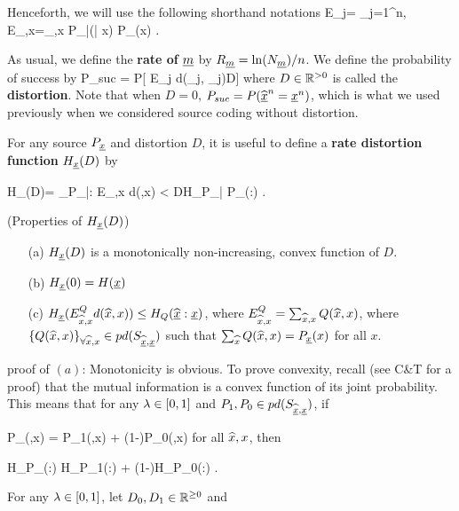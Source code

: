 Henceforth, we will use
the following shorthand notations
\beq
E_j= \sum_{j=1}^n\;,
\;\;
E_{,x}=\sum_{,x} P_{\what{\rvx}|\rvx}(| x)
P_\rvx(x)
\;.
\eeq

As usual, we define the  {\bf rate of} ${\underline{m}}$
by $R_{\underline{m}} = \ln(N_{\underline{m}})/n$.
We define the probability of success by
\beq
P_{suc} = P[
E_j d(\what{\rvx}_j, \rvx_j)\leq D]
\;
\label{sit-eq-def-of-d}
\eeq
where $D\in{ \mathbb{R}}^{>0}$ is called
the {\bf distortion}.
Note that when $D=0$,
$P_{suc}= P({\widehat{{\underline{x}}}}^n={\underline{x}}^n)$,
which is what we used
previously when we considered
source coding
without distortion.

For any source $P_{\underline{x}}$ and distortion $D$,
it is useful to define a
{\bf rate distortion function}
$H_{\underline{x}}(D)$ by

\beq
H_\rvx(D)=
\min_{P_{\what{\rvx}|\rvx}:
E_{,x} d(,x)
< D}H_{P_{\what{\rvx}|\rvx}
P_\rvx}(\what{\rvx}:\rvx)
\;.
\eeq

\begin{claim}\label{cl-props-rat-dis}
(Properties of $H_{\underline{x}}(D)$)

\begin{itemize}
\item[(a)]
$H_{\underline{x}}(D)$ is a monotonically non-increasing,
convex
function of $D$.
\item[(b)]
$H_{\underline{x}}(0) = H({\underline{x}})$
\item[(c)]
$H_{\underline{x}}(E^{Q}_{{\widehat{x}},x}d({\widehat{x}},x))
\leq H_{Q}({\widehat{{\underline{x}}}}:{\underline{x}})$,
where $E^{Q}_{{\widehat{x}},x}=\sum_{{\widehat{x}},x}
Q({\widehat{x}},x)$,
where $\{Q({\widehat{x}},x)\}_{\forall {\widehat{x}},x}
\in pd(S_{{\widehat{{\underline{x}}}},{\underline{x}}})$
such that
$\sum_{{\widehat{x}}}Q({\widehat{x}},x)=P_{\underline{x}}(x)$
for all $x$.

\end{itemize}
\end{claim}
\proof

proof of $(a)$: Monotonicity is obvious.
To prove convexity, recall
(see C\&T for a proof) that
the mutual information is a convex
function of its joint probability.
This means that
for any $\lambda\in [0,1]$
and
$P_1, P_0\in pd(S_{{\widehat{{\underline{x}}}},{\underline{x}}})$,
if

\beq
P_\lam(,x) =
\lam P_1(,x) +
(1-\lam)P_0(,x)
\;
\label{sit-eq-p-lam-def}
\eeq
for all ${\widehat{x}},x$,
then

\beq
H_{P_\lam}(\what{\rvx}:\rvx) \leq
\lam H_{P_1}(\what{\rvx}:\rvx) +
(1-\lam)H_{P_0}(\what{\rvx}:\rvx)
\;.
\eeq

For any
$\lambda \in [0,1]$,
let
$D_0, D_1\in { \mathbb{R}}^{\geq 0}$
and


